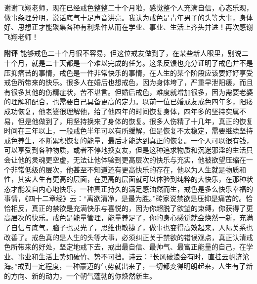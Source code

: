 \begin{case}
    谢谢飞翔老师，现在已经戒色整整二十个月啦，感觉整个人充满自信，心态乐观，做事条理分明，说话底气十足声音洪亮。我认为戒色是青年男子的头等大事，身体好、思想正才能聚集各种有利条件从而在学业、事业、生活上齐头并进！再次感谢飞翔老师！

    \textbf{附评} 能够戒色二十个月很不容易，但这位戒友做到了，在某些新人眼里，别说二十个月，就是二十天都是一个难以完成的任务。这条反馈也充分证明了戒色并不是压抑痛苦的事情，戒色是一件非常快乐的事情，在人生的某个阶段应该要好好享受戒色所带来的快乐。很多人在婚后也想戒色，因为身体垮了，严重早泄阳痿，而且有很多其他的伤精症状，苦不堪言。但婚后戒色，难度就增加很多，因为需要老婆的理解和配合，也需要自己具备更高的定力。以前一位已婚戒友戒色四年多，阳痿成功恢复，他老婆很理解他，给了他四年的时间恢复身体，四年多的坚持实属不易，但是他做到了，用坚持换来了身体的恢复。很多人伤精了十几年，真正的恢复时间在三年以上，一般戒色半年可以有所缓解，但是恢复不太稳定，需要继续坚持戒色养生，不断累积恢复的能量，最后才能达到真正的恢复。一个人可以很有钱，可以享受到各种物质，或者不停地换女友，但是这种追求物质和沉迷邪淫的生活只会让他的灵魂更空虚，无法让他体验到更高层次的快乐与充实，他被欲望压缩在一个非常低级的层次，他甚至不知道还有更高快乐的存在，他以为人生就是物质和性，其实人生有更高的层面，在更高的层面就可以体验到纯粹的大快乐，在那种状态才能发自内心地快乐，一种真正持久的满足感油然而生，戒色是多么快乐幸福的事情，《四十二章经》云：“离欲清净，是最为胜。”砖家说禁欲是压抑是痛苦的。恰恰相反，真正的禁欲是充满快乐与喜悦的，因为你超脱了欲望的束缚，你获得了更高层次的快乐。戒色是能量管理，能量养足了，你的身心感觉就会焕然一新，充满了自信与底气，脑子也灵光了，思维也敏捷了，做事也变得高效起来，人际关系也改善了。戒色真的是人生的头等大事，必须纠正关于禁欲的错误观点，真正认清戒色所带来的好处，坚定地戒下去，戒出最自信、最帅气、最富正能量的自己，在学业、事业和生活上势如破竹、势不可挡。诗云：“长风破浪会有时，直挂云帆济沧海。”戒到一定程度，一种豪迈的气势就出来了，一切都变得明朗起来，人生有了新的方向、新的动力，一个朝气蓬勃的你焕然新生。
\end{case}

